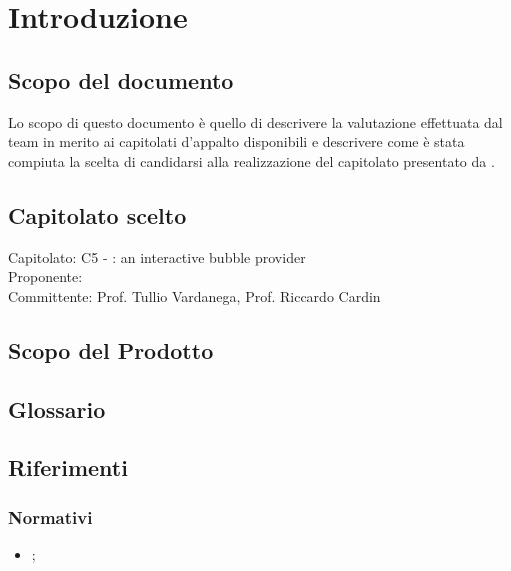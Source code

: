 \section{Introduzione}

\subsection{Scopo del documento}
Lo scopo di questo documento è quello di descrivere la valutazione effettuata dal team in merito ai capitolati d'appalto disponibili e descrivere come è stata compiuta la scelta di candidarsi alla realizzazione del capitolato \ProjectName{} presentato da \Proponente. 

\subsection{Capitolato scelto}
Capitolato: C5 - \ProjectName{}: an interactive bubble provider\\
Proponente: \Proponente{} \\
Committente: Prof. Tullio Vardanega, Prof. Riccardo Cardin \\

\subsection{Scopo del Prodotto}
\ScopoDelProdotto

\subsection{Glossario}
\GlossarioIntroduzione

\subsection{Riferimenti}
\subsubsection{Normativi}
\begin{itemize}
	\item \textbf{\NormeDiProgetto};
\end{itemize}

